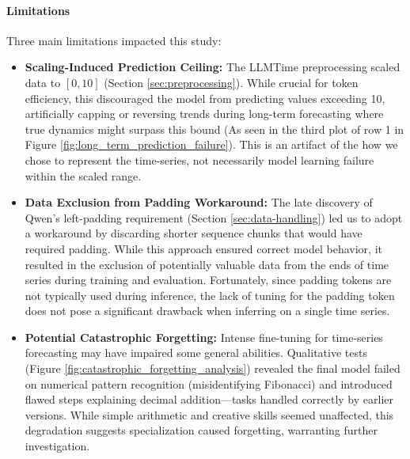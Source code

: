 \documentclass{article}
\begin{document}
\paragraph{Limitations}
Three main limitations impacted this study:
\begin{itemize}
    \item \textbf{Scaling-Induced Prediction Ceiling:} The LLMTime preprocessing scaled data to $[0, 10]$ (Section \ref{sec:preprocessing}). While crucial for token efficiency, this discouraged the model from predicting values exceeding 10, artificially capping or reversing trends during long-term forecasting where true dynamics might surpass this bound (As seen in the third plot of row 1 in Figure \ref{fig:long_term_prediction_failure}). This is an artifact of the how we chose to represent the time-series, not necessarily model learning failure within the scaled range.
    \item \textbf{Data Exclusion from Padding Workaround:} The late discovery of Qwen's left-padding requirement (Section \ref{sec:data-handling}) led us to adopt a workaround by discarding shorter sequence chunks that would have required padding. While this approach ensured correct model behavior, it resulted in the exclusion of potentially valuable data from the ends of time series during training and evaluation. Fortunately, since padding tokens are not typically used during inference, the lack of tuning for the padding token does not pose a significant drawback when inferring on a single time series.
    \item \textbf{Potential Catastrophic Forgetting:} Intense fine-tuning for time-series forecasting may have impaired some general abilities. Qualitative tests (Figure \ref{fig:catastrophic_forgetting_analysis}) revealed the final model failed on numerical pattern recognition (misidentifying Fibonacci) and introduced flawed steps explaining decimal addition—tasks handled correctly by earlier versions. While simple arithmetic and creative skills seemed unaffected, this degradation suggests specialization caused forgetting, warranting further investigation.
\end{itemize}
\end{document}
